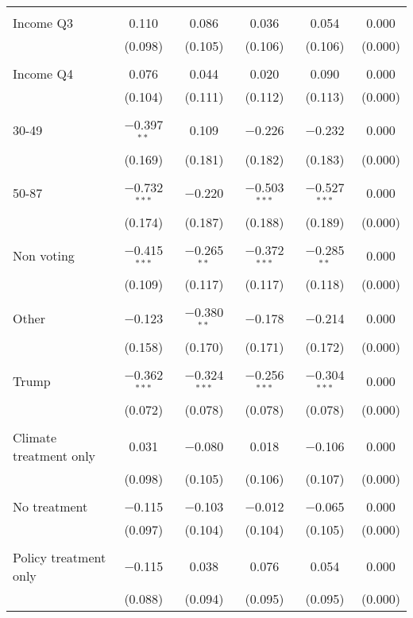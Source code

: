 \begin{tabular}{@{\extracolsep{5pt}}lccccc}
  & & & & & \\ 
 Income Q3 & 0.110 & 0.086 & 0.036 & 0.054 & 0.000 \\ 
  & (0.098) & (0.105) & (0.106) & (0.106) & (0.000) \\ 
  & & & & & \\ 
 Income Q4 & 0.076 & 0.044 & 0.020 & 0.090 & 0.000 \\ 
  & (0.104) & (0.111) & (0.112) & (0.113) & (0.000) \\ 
  & & & & & \\ 
 30-49 & $-$0.397$^{**}$ & 0.109 & $-$0.226 & $-$0.232 & 0.000 \\ 
  & (0.169) & (0.181) & (0.182) & (0.183) & (0.000) \\ 
  & & & & & \\ 
 50-87 & $-$0.732$^{***}$ & $-$0.220 & $-$0.503$^{***}$ & $-$0.527$^{***}$ & 0.000 \\ 
  & (0.174) & (0.187) & (0.188) & (0.189) & (0.000) \\ 
  & & & & & \\ 
 Non voting & $-$0.415$^{***}$ & $-$0.265$^{**}$ & $-$0.372$^{***}$ & $-$0.285$^{**}$ & 0.000 \\ 
  & (0.109) & (0.117) & (0.117) & (0.118) & (0.000) \\ 
  & & & & & \\ 
 Other & $-$0.123 & $-$0.380$^{**}$ & $-$0.178 & $-$0.214 & 0.000 \\ 
  & (0.158) & (0.170) & (0.171) & (0.172) & (0.000) \\ 
  & & & & & \\ 
 Trump & $-$0.362$^{***}$ & $-$0.324$^{***}$ & $-$0.256$^{***}$ & $-$0.304$^{***}$ & 0.000 \\ 
  & (0.072) & (0.078) & (0.078) & (0.078) & (0.000) \\ 
  & & & & & \\ 
 Climate treatment only & 0.031 & $-$0.080 & 0.018 & $-$0.106 & 0.000 \\ 
  & (0.098) & (0.105) & (0.106) & (0.107) & (0.000) \\ 
  & & & & & \\ 
 No treatment & $-$0.115 & $-$0.103 & $-$0.012 & $-$0.065 & 0.000 \\ 
  & (0.097) & (0.104) & (0.104) & (0.105) & (0.000) \\ 
  & & & & & \\ 
 Policy treatment only & $-$0.115 & 0.038 & 0.076 & 0.054 & 0.000 \\ 
  & (0.088) & (0.094) & (0.095) & (0.095) & (0.000) \\ 

\end{tabular}
